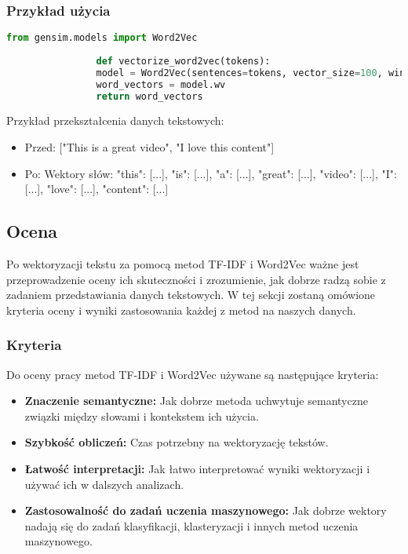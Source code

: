 	
 		\subsubsection{Przykład użycia}
 			\begin{lstlisting}[language=Python]
				from gensim.models import Word2Vec
	
				def vectorize_word2vec(tokens):
				model = Word2Vec(sentences=tokens, vector_size=100, window=5, min_count=1, workers=4)
				word_vectors = model.wv
				return word_vectors
			\end{lstlisting}

			Przykład przekształcenia danych tekstowych:

			\begin{itemize}
				\item Przed: ["This is a great video", "I love this content"]
				\item Po: Wektory słów: { "this": [...], "is": [...], "a": [...], "great": [...], "video": [...], "I": [...], "love": [...], "content": [...] }
			\end{itemize}
 	
 	\subsection{Ocena}
 		Po wektoryzacji tekstu za pomocą metod TF-IDF i Word2Vec ważne jest przeprowadzenie oceny ich skuteczności i zrozumienie, jak dobrze radzą sobie z zadaniem przedstawiania danych tekstowych. W tej sekcji zostaną omówione kryteria oceny i wyniki zastosowania każdej z metod na naszych danych.
 	
 		\subsubsection{Kryteria}
 			Do oceny pracy metod TF-IDF i Word2Vec używane są następujące kryteria:
 		
			\begin{itemize}
				\item \textbf{Znaczenie semantyczne:} Jak dobrze metoda uchwytuje semantyczne związki między słowami i kontekstem ich użycia.
				\item \textbf{Szybkość obliczeń:} Czas potrzebny na wektoryzację tekstów.
				\item \textbf{Łatwość interpretacji:} Jak łatwo interpretować wyniki wektoryzacji i używać ich w dalszych analizach.
				\item \textbf{Zastosowalność do zadań uczenia maszynowego:} Jak dobrze wektory nadają się do zadań klasyfikacji, klasteryzacji i innych metod uczenia maszynowego.
			\end{itemize}
		
